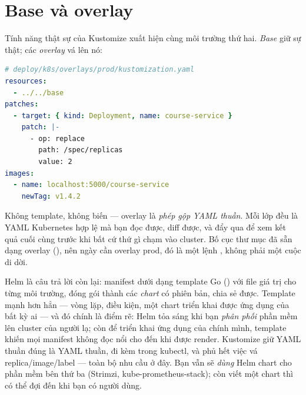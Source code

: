 \section{Base và overlay}

Tính năng thật sự của Kustomize xuất hiện cùng môi trường thứ hai.
\emph{Base} giữ sự thật; các \emph{overlay} vá lên nó:

\begin{lstlisting}[language=yaml]
# deploy/k8s/overlays/prod/kustomization.yaml
resources:
  - ../../base
patches:
  - target: { kind: Deployment, name: course-service }
    patch: |-
      - op: replace
        path: /spec/replicas
        value: 2
images:
  - name: localhost:5000/course-service
    newTag: v1.4.2
\end{lstlisting}

Không template, không biến --- overlay là \emph{phép gộp YAML thuần}.
Mỗi lớp đều là YAML Kubernetes hợp lệ mà bạn đọc được, diff được, và
đẩy qua  để xem kết quả cuối cùng trước khi
bất cứ thứ gì chạm vào cluster. Bố cục thư mục đã sẵn dạng overlay
(), nên ngày cần overlay prod, đó là một lệnh
, không phải một cuộc di dời.

\begin{decision}
Helm là câu trả lời còn lại: manifest dưới dạng template Go
() với file giá trị cho
từng môi trường, đóng gói thành các \emph{chart} có phiên bản, chia sẻ
được. Template mạnh hơn hẳn --- vòng lặp, điều kiện, một chart triển
khai được ứng dụng của bất kỳ ai --- và đó chính là điểm rẽ: Helm tỏa
sáng khi bạn \emph{phân phối} phần mềm lên cluster của người lạ; còn
để triển khai ứng dụng của chính mình, template khiến mọi manifest
không đọc nổi cho đến khi được render. Kustomize giữ YAML thuần đúng
là YAML thuần, đi kèm trong kubectl, và phủ hết việc vá
replica/image/label --- toàn bộ nhu cầu ở đây. Bạn vẫn sẽ \emph{dùng}
Helm chart cho phần mềm bên thứ ba (Strimzi, kube-prometheus-stack);
còn viết một chart thì có thể đợi đến khi bạn có người dùng.
\end{decision}

